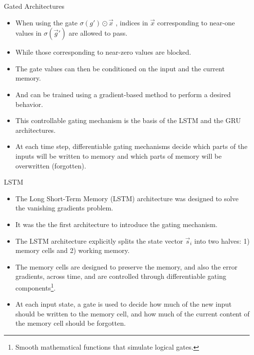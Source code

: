 \documentclass[handout]{beamer}
\begin{document}
\begin{frame}{Gated Architectures}
\begin{scriptsize}

\begin{itemize}
\item When using the gate $\sigma(g')\odot \vec{x}$ , indices in $\vec{x}$ corresponding to near-one values in $\sigma(\vec{g}')$ are allowed to pass.
\item While those corresponding to near-zero values are blocked. 
\item The gate values can then be conditioned on the input and the current memory.
\item And can be trained using a gradient-based method to perform a desired behavior.
\item This controllable gating mechanism is the basis of the LSTM and the GRU architectures.
\item At each time step, differentiable gating mechanisms decide which parts of the inputs will be written to memory and which parts of memory will be overwritten (forgotten). 
\end{itemize}
\end{scriptsize}
\end{frame}


\begin{frame}{LSTM}
\begin{scriptsize}

\begin{itemize}
\item The Long Short-Term Memory (LSTM) architecture \cite{hochreiter1997long} was designed to solve the vanishing gradients problem. 
\item It was the the first architecture to introduce the gating mechanism.
\item The LSTM architecture explicitly splits the state vector $\vec{s}_i$ into two halves: 1) memory cells and 2) working memory.
\item The memory cells are designed to preserve the memory, and also the error gradients, across time, and are controlled through differentiable gating components\footnote{Smooth mathematical functions that simulate logical gates.}.
\item At each input state, a gate is used to decide how much of the new input should be written to the memory cell, and how much of the current content of the memory cell should be forgotten.
\end{itemize}
\end{scriptsize}
\end{frame}
\end{document}
